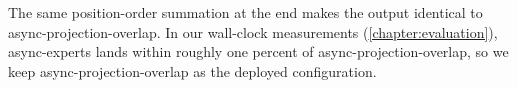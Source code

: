 The same position-order summation at the end makes the output identical to async-projection-overlap.
In our wall-clock measurements (\autoref{chapter:evaluation}), async-experts lands within roughly one percent of async-projection-overlap, so we keep async-projection-overlap as the deployed configuration.
